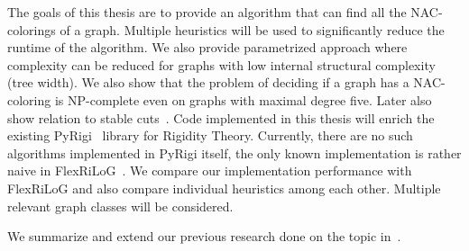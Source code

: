The goals of this thesis are to provide an algorithm
that can find all the NAC-colorings of a graph.
Multiple heuristics will be used to significantly
reduce the runtime of the algorithm.
We also provide parametrized approach where complexity can be reduced for graphs
with low internal structural complexity (tree width).
We also show that the problem of deciding if a graph has a NAC-coloring
is NP-complete even on graphs with maximal degree five.
Later also show relation to stable cuts~\cite{stable_cuts_2v_4}.
Code implemented in this thesis will enrich the existing PyRigi~\cite{pyrigi}
library for Rigidity Theory.
Currently, there are no such algorithms implemented in PyRigi itself,
the only known implementation is rather naive in FlexRiLoG~\cite{flexrilog}.
We compare our implementation performance with FlexRiLoG and also compare
individual heuristics among each other.
Multiple relevant graph classes will be considered.

We summarize and extend our previous research done
on the topic in~\cite{my_paper}.

